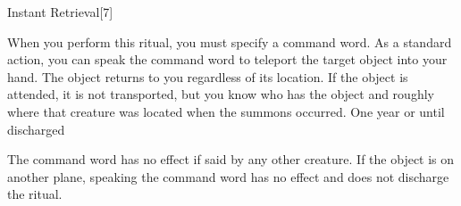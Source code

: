 \begin{spellsection}{Instant Retrieval}[7]
    \begin{spellheader}
    \end{spellheader}
    \begin{spellcontent}
        \begin{spelltargetinginfo}
        \end{spelltargetinginfo}
        \begin{spelleffects}
            \spellspecial When you perform this ritual, you must specify a command word.
            \spelleffect As a standard action, you can speak the command word to teleport the target object into your hand. The object returns to you regardless of its location. If the object is attended, it is not transported, but you know who has the object and roughly where that creature was located when the summons occurred.
            \spelldur One year or until discharged
        \end{spelleffects}
    \end{spellcontent}
    \begin{spellfooter}
        \spellnotes The command word has no effect if said by any other creature. If the object is on another plane, speaking the command word has no effect and does not discharge the ritual.
    \end{spellfooter}
    \begin{spellaugments}
    \end{spellaugments}
\end{spellsection}

